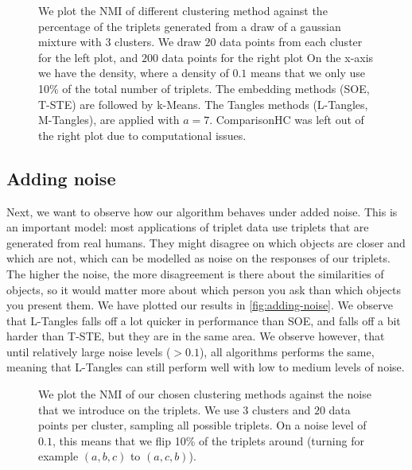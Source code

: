 \onecolumn
\begin{figure}[ht]
    \centering
    \caption{
        We plot the NMI of different clustering method against the percentage of the triplets generated from a draw of a gaussian mixture with $3$ clusters. 
        We draw $20$ data points from each cluster for the left plot, and $200$ data points for the right plot 
        On the x-axis we have the density, where a density of $0.1$ means that we only use 10\% of the total number of triplets. The embedding methods (SOE, T-STE) are 
        followed by k-Means. The Tangles methods (L-Tangles, M-Tangles), are applied with $a=7$. ComparisonHC was left out of the right plot due to computational issues.}
    \label{fig:density-change}
\end{figure}


\subsection{Adding noise}\label{sec:adding-noise}
Next, we want to observe how our algorithm behaves under added noise. This is an important model: most applications of triplet data use triplets that are generated from
real humans. They might disagree on which objects are closer and which are not, which can be modelled as noise on the responses of our triplets. The higher the noise, 
the more disagreement is there about the similarities of objects, so it would matter more about which person you ask than which objects you present them. 
We have plotted our results in \autoref{fig:adding-noise}. 
We observe that L-Tangles falls off a lot quicker in performance than SOE, and falls off a bit harder than T-STE, but they are in the same area. We observe however, that until
relatively large noise levels ($>0.1$), all algorithms performs the same, meaning that L-Tangles can still perform well with low to medium levels of noise.

\begin{figure}[h]
    \centering
    \resizebox{0.7\textwidth}{!}{}
    \caption{}
    \label{fig:adding-noise}
    \caption{
        We plot the NMI of our chosen clustering methods against the noise that we introduce on the triplets.  We use $3$ clusters and $20$ data points per cluster, sampling all possible triplets. On a noise level of $0.1$, this means that we flip 10\% of the triplets around (turning for example $(a,b,c)$ to $(a,c,b)$). 
    }
\end{figure}

